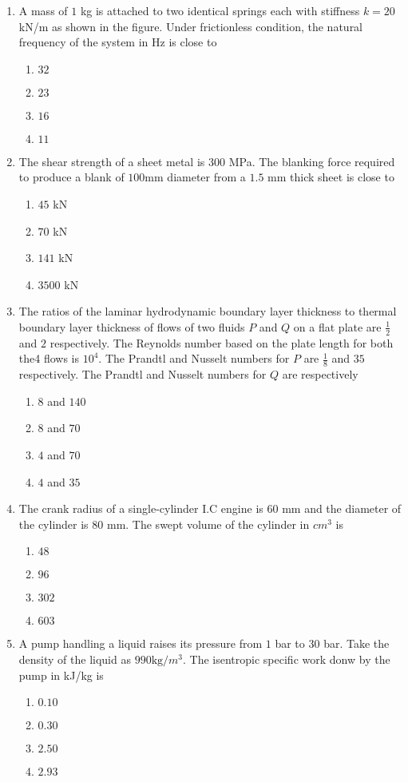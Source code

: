 \documentclass[journal,12pt,onecolumn]{IEEEtran}
\theoremstyle{remark}
\begin{document}
\begin{enumerate}
\item A mass of $1$ kg is attached to two identical springs each with stiffness $k=20$ kN/m as shown in the figure. Under frictionless condition, the natural frequency of the system in Hz is close to

\begin{enumerate}
\item $32$
\item $23$
\item $16$
\item $11$
\end{enumerate}

\item The shear strength of a sheet metal is $300$ MPa. The blanking force required to produce a blank of $100$mm diameter from a $1.5$ mm thick sheet is close to
\begin{enumerate}
\item $45$ kN
\item $70$ kN
\item $141$ kN
\item $3500$ kN
\end{enumerate}

\item The ratios of the laminar hydrodynamic boundary layer thickness to thermal boundary layer thickness of flows of two fluids $P$ and $Q$ on a flat plate are $\frac{1}{2}$ and $2$ respectively. The Reynolds number based on the plate length for both the4 flows is $10^4$. The Prandtl and Nusselt numbers for $P$ are $\frac{1}{8}$ and $35$ respectively. The Prandtl and Nusselt numbers for $Q$ are respectively
\begin{enumerate}
\item $8$ and $140$
\item $8$ and $70$
\item $4$ and $70$
\item $4$ and $35$
\end{enumerate}

\item The crank radius of a single-cylinder I.C engine is $60$ mm and the diameter of the cylinder is $80$ mm. The swept volume of the cylinder in ${cm}^3$ is
\begin{enumerate}
\item $48$
\item $96$
\item $302$
\item $603$
\end{enumerate}

\item A pump handling a liquid raises its pressure from $1$ bar to $30$ bar. Take the density of the liquid as $990 \text{kg}/{m}^3$. The isentropic specific work donw by the pump in kJ/kg is
\begin{enumerate}
\item $0.10$
\item $0.30$
\item $2.50$
\item $2.93$
\end{enumerate}



\end{enumerate}
\end{document}
